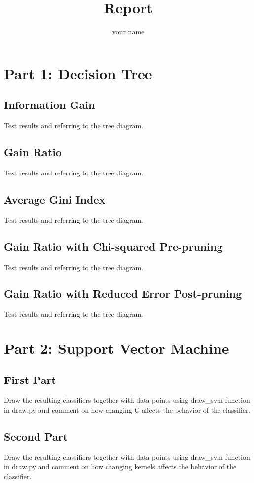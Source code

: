 \documentclass{article}
\title{Report}
\author{your name}
\begin{document}
\maketitle
\section{Part 1: Decision Tree}
\subsection{Information Gain}
Test results and referring to the tree diagram.

\subsection{Gain Ratio}
Test results and referring to the tree diagram.

\subsection{Average Gini Index}
Test results and referring to the tree diagram.

\subsection{Gain Ratio with Chi-squared Pre-pruning}
Test results and referring to the tree diagram.

\subsection{Gain Ratio with Reduced Error Post-pruning}
Test results and referring to the tree diagram.

\maketitle
\section{Part 2: Support Vector Machine}
\subsection{First Part}
Draw the resulting classifiers together with data points using draw\_svm function in draw.py and comment on how changing C affects the behavior of the classifier.

\subsection{Second Part}
Draw the resulting classifiers together with data points using draw\_svm function in draw.py and comment on how changing kernels affects the behavior of the classifier.
\end{document}
